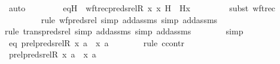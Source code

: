 \begin{isabellebody}
\ auto\ \isanewline
\ \ \ \ \isamarkupfalse%
\ \isamarkupfalse%
\ eqH\ {\isacharcolon}{\kern0pt}\ {\isachardoublequoteopen}wftrec{\isacharparenleft}{\kern0pt}preds{\isacharunderscore}{\kern0pt}rel{\isacharparenleft}{\kern0pt}R{\isacharcomma}{\kern0pt}\ x{\isacharparenright}{\kern0pt}{\isacharcomma}{\kern0pt}\ x{\isacharcomma}{\kern0pt}\ H{\isacharparenright}{\kern0pt}\ {\isacharequal}{\kern0pt}\ H{\isacharparenleft}{\kern0pt}x{\isacharcomma}{\kern0pt}\ {}{\isacharparenright}{\kern0pt}{\isachardoublequoteclose}\ \isanewline
\ \ \ \ \ \ \isamarkupfalse%
{\isacharparenleft}{\kern0pt}subst\ wftrec{\isacharparenright}{\kern0pt}\isanewline
\ \ \ \ \ \ \ \ \isamarkupfalse%
{\isacharparenleft}{\kern0pt}rule\ wf{\isacharunderscore}{\kern0pt}preds{\isacharunderscore}{\kern0pt}rel{\isacharcomma}{\kern0pt}\ simp\ add{\isacharcolon}{\kern0pt}assms{\isacharcomma}{\kern0pt}\ simp\ add{\isacharcolon}{\kern0pt}assms{\isacharparenright}{\kern0pt}\isanewline
\ \ \ \ \ \ \ \isamarkupfalse%
{\isacharparenleft}{\kern0pt}rule\ trans{\isacharunderscore}{\kern0pt}preds{\isacharunderscore}{\kern0pt}rel{\isacharcomma}{\kern0pt}\ simp\ add{\isacharcolon}{\kern0pt}assms{\isacharcomma}{\kern0pt}\ simp\ add{\isacharcolon}{\kern0pt}assms{\isacharparenright}{\kern0pt}\isanewline
\ \ \ \ \ \ \isamarkupfalse%
\ simp\isanewline
\ \ \ \ \isamarkupfalse%
\ eq{}{\isacharprime}{\kern0pt}{\isacharcolon}{\kern0pt}\ {\isachardoublequoteopen}prel{\isacharparenleft}{\kern0pt}preds{\isacharunderscore}{\kern0pt}rel{\isacharparenleft}{\kern0pt}R{\isacharcomma}{\kern0pt}\ x{\isacharparenright}{\kern0pt}{\isacharcomma}{\kern0pt}\ {\isacharbraceleft}{\kern0pt}a{\isacharbraceright}{\kern0pt}{\isacharparenright}{\kern0pt}\ {\isacharminus}{\kern0pt}{\isacharbackquote}{\kern0pt}{\isacharbackquote}{\kern0pt}\ {\isacharbraceleft}{\kern0pt}{\isacharless}{\kern0pt}x{\isacharcomma}{\kern0pt}\ a{\isachargreater}{\kern0pt}{\isacharbraceright}{\kern0pt}\ {\isacharequal}{\kern0pt}\ {}{\isachardoublequoteclose}\ \isanewline
\ \ \ \ \isamarkupfalse%
{\isacharparenleft}{\kern0pt}rule\ ccontr{\isacharparenright}{\kern0pt}\isanewline
\ \ \ \ \ \ \isamarkupfalse%
\ {\isachardoublequoteopen}prel{\isacharparenleft}{\kern0pt}preds{\isacharunderscore}{\kern0pt}rel{\isacharparenleft}{\kern0pt}R{\isacharcomma}{\kern0pt}\ x{\isacharparenright}{\kern0pt}{\isacharcomma}{\kern0pt}\ {\isacharbraceleft}{\kern0pt}a{\isacharbraceright}{\kern0pt}{\isacharparenright}{\kern0pt}\ {\isacharminus}{\kern0pt}{\isacharbackquote}{\kern0pt}{\isacharbackquote}{\kern0pt}\ {\isacharbraceleft}{\kern0pt}{\isasymlangle}x{\isacharcomma}{\kern0pt}\ a{\isasymrangle}{\isacharbraceright}{\kern0pt}\ {\isasymnoteq}\ {}{\isachardoublequoteclose}\ \isanewline

\end{isabellebody}
